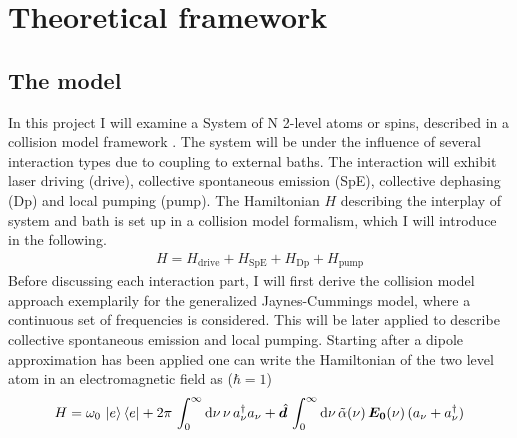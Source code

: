 

\chapter{Theoretical framework}\label{ch:theory}
\section{The model}
%
In this project I will examine a System of N 2-level atoms or spins, described in a collision model framework \cite{ciccarello_quantum_2022,gross_qubit_2018}. The system will be under the influence of several interaction types due to coupling to external baths. The interaction will exhibit laser driving (drive), collective spontaneous emission (SpE), collective dephasing (Dp) and local pumping (pump). The Hamiltonian $H$ describing the interplay of system and bath is set up in a collision model formalism, which I will introduce in the following.
\begin{align}
    H = H_\text{drive}+H_\text{SpE}+H_\text{Dp}+H_\text{pump}
\end{align}
Before discussing each interaction part, I will first derive the collision model approach exemplarily for the generalized Jaynes-Cummings model, where a continuous set of frequencies is considered. This will be later applied to describe collective spontaneous emission and local pumping. Starting after a dipole approximation has been applied one can write the Hamiltonian of the two level atom in an electromagnetic field as ($\hbar=1$)
\begin{align*}
    H= {\omega_0}\,\ket{e}\bra{e}+2\pi\,\int_{0}^\infty\text{d}\nu\,\nu\,a^\dagger_\nu a_\nu+ \hat{\boldsymbol{d}}\,\int_{0}^\infty\text{d}\nu\,\tilde{\alpha}(\nu)\,\boldsymbol{E_0}(\nu)\,(a_\nu+a^\dagger_\nu)
\end{align*}
